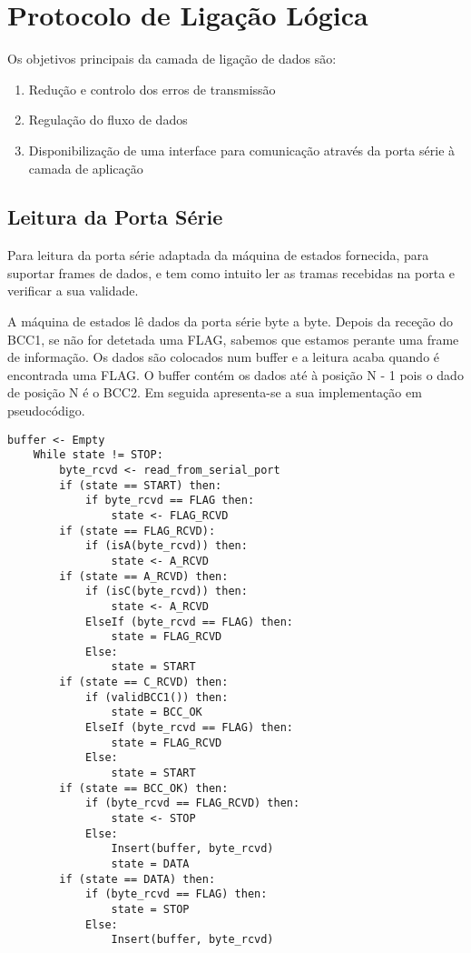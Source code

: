 \section{Protocolo de Ligação Lógica}

Os objetivos principais da camada de ligação de dados são:

\begin{enumerate}
    \item Redução e controlo dos erros de transmissão
    \item Regulação do fluxo de dados
    \item Disponibilização de uma interface para comunicação através da porta série à camada de aplicação
\end{enumerate}



\subsection{Leitura da Porta Série}

Para leitura da porta série adaptada da máquina de estados fornecida, para suportar frames de dados, e tem como intuito ler as tramas recebidas na porta e verificar a sua validade. 

A máquina de estados lê dados da porta série byte a byte. Depois da receção do BCC1, se não for detetada uma FLAG, sabemos que estamos perante uma frame de informação. Os dados são colocados num buffer e a leitura acaba quando é encontrada uma FLAG. O buffer contém os dados até à posição N - 1 pois o dado de posição N é o BCC2. Em seguida apresenta-se a sua implementação em pseudocódigo.  

\begin{lstlisting}[caption=Pseudocódigo da StateMachine]
    buffer <- Empty
    While state != STOP:
        byte_rcvd <- read_from_serial_port
        if (state == START) then:
            if byte_rcvd == FLAG then:
                state <- FLAG_RCVD
        if (state == FLAG_RCVD):
            if (isA(byte_rcvd)) then:
                state <- A_RCVD
        if (state == A_RCVD) then:
            if (isC(byte_rcvd)) then:
                state <- A_RCVD
            ElseIf (byte_rcvd == FLAG) then:
                state = FLAG_RCVD
            Else:
                state = START
        if (state == C_RCVD) then:
            if (validBCC1()) then:
                state = BCC_OK
            ElseIf (byte_rcvd == FLAG) then:
                state = FLAG_RCVD
            Else:
                state = START
        if (state == BCC_OK) then:
            if (byte_rcvd == FLAG_RCVD) then:
                state <- STOP
            Else:
                Insert(buffer, byte_rcvd)
                state = DATA
        if (state == DATA) then:
            if (byte_rcvd == FLAG) then:
                state = STOP
            Else:
                Insert(buffer, byte_rcvd)
\end{lstlisting}

